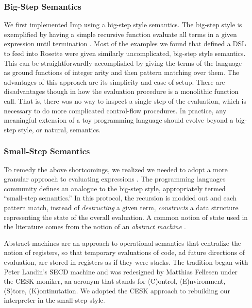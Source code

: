 \subsubsection{Big-Step Semantics}
We first implemented Imp using a big-step style semantics. The big-step style is exemplified by having a simple recursive function evaluate all terms in a given expression until termination \citep{huttel2010}.  Most of the examples we found that defined a DSL to feed into Rosette were given similarly uncomplicated, big-step style semantics.  This can be straightforwardly accomplished by giving the terms of the language as ground functions of integer arity and then pattern matching over them.  The advantages of this approach are its simplicity and ease of setup.  There are disadvantages though in how the evaluation procedure is a monolithic function call.  That is, there was no way to inspect a single step of the evaluation, which is necessary to do more complicated control-flow procedures.  In practice, any meaningful extension of a toy programming language should evolve beyond a big-step style, or natural, semantics.

\subsubsection{Small-Step Semantics}
To remedy the above shortcomings, we realized we needed to adopt a more granular approach to evaluating expressions \citep{fernandez2004}.  The programming languages community defines an analogue to the big-step style, appropriately termed ``small-step semantics.''  In this protocol, the recursion is modded out and each pattern match, instead of \emph{destructing} a given term, \emph{constructs} a data structure representing the state of the overall evaluation.  A common notion of state used in the literature comes from the notion of an \emph{abstract machine} \citep{huttel2010}.

Abstract machines are an approach to operational semantics that centralize the notion of registers, so that temporary evaluations of code, ad future directions of evaluation, are stored in registers as if they were stacks.   The tradition began with Peter Landin's SECD machine and was redesigned by Matthias Fellesen under the CESK moniker, an acronym that stands for (C)ontrol, (E)nvironment, (S)tore, (K)ontinutation.  We adopted the CESK approach to rebuilding our interpreter in the small-step style.

